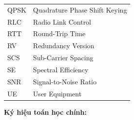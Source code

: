 \begin{tabular}{l l}
\hspace{1cm} QPSK     & \hspace{1cm} Quadrature Phase Shift Keying \\
\hspace{1cm} RLC      & \hspace{1cm} Radio Link Control \\
\hspace{1cm} RTT      & \hspace{1cm} Round-Trip Time \\
\hspace{1cm} RV       & \hspace{1cm} Redundancy Version \\
\hspace{1cm} SCS      & \hspace{1cm} Sub-Carrier Spacing \\
\hspace{1cm} SE       & \hspace{1cm} Spectral Efficiency \\
\hspace{1cm} SNR      & \hspace{1cm} Signal-to-Noise Ratio \\
\hspace{1cm} UE       & \hspace{1cm} User Equipment \\
\end{tabular}

\vspace{12pt}
\textbf{Ký hiệu toán học chính:}

